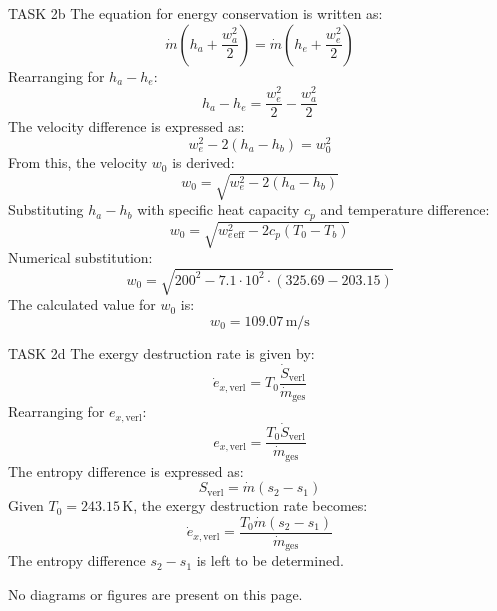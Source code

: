 TASK 2b  
The equation for energy conservation is written as:  
\[
\dot{m} \left( h_a + \frac{w_a^2}{2} \right) = \dot{m} \left( h_e + \frac{w_e^2}{2} \right)
\]  
Rearranging for \( h_a - h_e \):  
\[
h_a - h_e = \frac{w_e^2}{2} - \frac{w_a^2}{2}
\]  
The velocity difference is expressed as:  
\[
w_e^2 - 2(h_a - h_b) = w_0^2
\]  
From this, the velocity \( w_0 \) is derived:  
\[
w_0 = \sqrt{w_e^2 - 2(h_a - h_b)}
\]  
Substituting \( h_a - h_b \) with specific heat capacity \( c_p \) and temperature difference:  
\[
w_0 = \sqrt{w_e^2_{\text{eff}} - 2 c_p (T_0 - T_b)}
\]  
Numerical substitution:  
\[
w_0 = \sqrt{200^2 - 7.1 \cdot 10^2 \cdot (325.69 - 203.15)}
\]  
The calculated value for \( w_0 \) is:  
\[
w_0 = 109.07 \, \text{m/s}
\]  

TASK 2d  
The exergy destruction rate is given by:  
\[
\dot{e}_{x,\text{verl}} = T_0 \frac{\dot{S}_{\text{verl}}}{\dot{m}_{\text{ges}}}
\]  
Rearranging for \( e_{x,\text{verl}} \):  
\[
e_{x,\text{verl}} = \frac{T_0 \dot{S}_{\text{verl}}}{\dot{m}_{\text{ges}}}
\]  
The entropy difference is expressed as:  
\[
S_{\text{verl}} = \dot{m} \left( s_2 - s_1 \right)
\]  
Given \( T_0 = 243.15 \, \text{K} \), the exergy destruction rate becomes:  
\[
\dot{e}_{x,\text{verl}} = \frac{T_0 \dot{m} \left( s_2 - s_1 \right)}{\dot{m}_{\text{ges}}}
\]  
The entropy difference \( s_2 - s_1 \) is left to be determined.  

No diagrams or figures are present on this page.